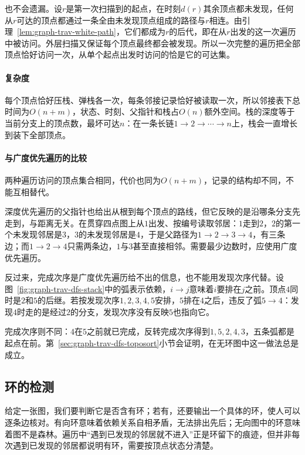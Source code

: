 也不会遗漏。设$r$是第一次扫描到的起点，在时刻$d(r)$其余顶点都未发现，任何从$r$可达的顶点都通过一条全由未发现顶点组成的路径与$r$相连。由引理~\ref{lem:graph-trav-white-path}，它们都成为$r$的后代，即在从$r$出发的这一次遍历中被访问。外层扫描又保证每个顶点最终都会被发现。所以一次完整的遍历把全部顶点恰好访问一次，从单个起点出发时访问的恰是它的可达集。

\paragraph{复杂度}
每个顶点恰好压栈、弹栈各一次，每条邻接记录恰好被读取一次，所以邻接表下总时间为$O(n+m)$，状态、时刻、父指针和栈占$O(n)$额外空间。栈的深度等于当前分支上的顶点数，最坏可达$n$：在一条长链$1\to2\to\cdots\to n$上，栈会一直增长到装下全部顶点。

\paragraph{与广度优先遍历的比较}
两种遍历访问的顶点集合相同，代价也同为$O(n+m)$，记录的结构却不同，不能互相替代。

深度优先遍历的父指针也给出从根到每个顶点的路线，但它反映的是沿哪条分支先走到，与距离无关。在贯穿四点图上从$1$出发、按编号读取邻居：$1$走到$2$，$2$的第一个未发现邻居是$3$，$3$的未发现邻居是$4$，于是父路径为$1\to2\to3\to4$，有三条边；而$1\to2\to4$只需两条边，$1$与$3$甚至直接相邻。需要最少边数时，应使用广度优先遍历。

反过来，完成次序是广度优先遍历给不出的信息，也不能用发现次序代替。设图~\ref{fig:graph-trav-dfs-stack}中的弧表示依赖，$i\to j$意味着$i$要排在$j$之前。顶点$4$同时是$2$和$5$的后继。若按发现次序$1,2,3,4,5$安排，$5$排在$4$之后，违反了弧$5\to4$：发现$4$时走的是经过$2$的分支，发现次序没有反映$5$也指向它。

完成次序则不同：$4$在$5$之前就已完成，反转完成次序得到$1,5,2,4,3$，五条弧都是起点在前。第~\ref{sec:graph-trav-dfs-toposort}小节会证明，在无环图中这一做法总是成立。

\subsection{环的检测}
\label{sec:graph-trav-cycle-detection}

给定一张图，我们要判断它是否含有环；若有，还要输出一个具体的环，使人可以逐条边核对。有向环意味着依赖关系自相矛盾，无法排出先后；无向图中的环意味着图不是森林。遍历中“遇到已发现的邻居就不进入”正是环留下的痕迹，但并非每次遇到已发现的邻居都说明有环，需要按顶点状态分清楚。

